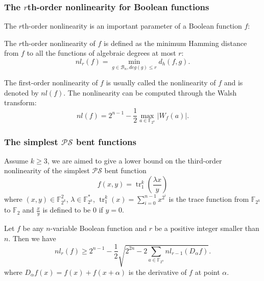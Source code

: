 \documentclass[
    aspectratio=169,                   %
]{beamer}
\newcommand{\F}{\mathbb{F}}
\newcommand{\Fn}{\mathbb{F}_{2^n}}
\newcommand{\Fks}{\mathbb{F}_{2^k}^*}
\newcommand{\Fk}{\mathbb{F}_{2^k}}
\newcommand{\tr}{\operatorname{tr}_1^k}
\newcommand{\Bn}{\mathcal{B}_n}
\begin{document}
    \begin{frame}
        \frametitle{The $ r $th-order nonlinearity for Boolean functions}
    
        The $ r $th-order nonlinearity is an important parameter of a Boolean function $ f $:
        \begin{definition}
            The $ r $th-order nonlinearity of $ f $ is 
            defined as the minimum Hamming distance from $ f $ to all the functions of algebraic degrees at most $ r $:
            \[nl_r(f)=\min_{g\in\Bn,deg(g)\le r}d_h(f,g).\]  
        \end{definition} 
        
        \begin{remark}
            The first-order nonlinearity of $ f $ is usually called the nonlinearity of $ f $ and is denoted by $ nl(f) $. 
            The nonlinearity can be computed through the Walsh transform: 
            \[nl(f)=2^{n-1}-\frac{1}{2}\max_{a\in\Fn}\left\lvert W_f(a)\right\rvert.\]
        \end{remark}
    \end{frame}


    \begin{frame}
        \frametitle{The simplest $ \mathcal{PS} $ bent functions}
        Assume $ k\ge 3 $, we are aimed to give a lower bound 
        on the third-order nonlinearity of the simplest $ \mathcal{PS} $ bent function
        \begin{equation}
            f(x,y)=\tr\left(\frac{\lambda x}{y}\right)
        \end{equation}
        where $ (x,y)\in\F_{2^k}^2 $, $ \lambda\in\Fks $,  
        $ \tr(x)=\sum_{i=0}^{n-1}x^{2^i} $ is the trace function from $ \Fk $ to $ \F_2 $ and $ \frac{x}{y} $ is defined 
        to be $ 0 $ if $ y =0 $. 
        \begin{lemma}
            Let $ f $ be any $ n $-variable Boolean function and $ r $ be a positive integer smaller than $ n $. 
            Then we have 
            \[nl_r(f)\ge 2^{n-1}-\frac{1}{2}\sqrt{2^{2n}-2\sum_{a\in\Fn}nl_{r-1}(D_{\alpha}f)}.\]
            where $ D_{\alpha}f(x) = f(x) + f(x+\alpha) $ is the derivative of $ f $ at point $ \alpha $.
        \end{lemma}
    \end{frame}
        
\end{document}
